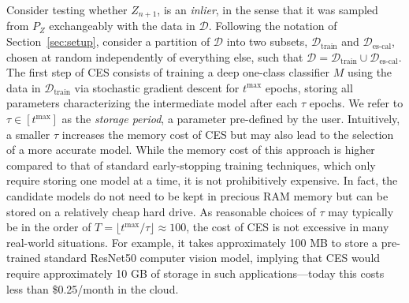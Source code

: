 Consider testing whether $Z_{n+1}$, is an {\em inlier}, in the sense that it was sampled from $P_Z$ exchangeably with the data in $\mathcal{D}$.
Following the notation of Section~\ref{sec:setup}, consider a partition of $\mathcal{D}$ into two subsets, $\mathcal{D}_{\text{train}}$ and $\mathcal{D}_{\text{es-cal}}$, chosen at random independently of everything else, such that $\mathcal{D}=\mathcal{D}_{\text{train}} \cup \mathcal{D}_{\text{es-cal}}$.
The first step of CES consists of training a deep one-class classifier $M$ using the data in $\mathcal{D}_{\text{train}}$ via stochastic gradient descent for $t^{\text{max}}$ epochs, storing all parameters characterizing the intermediate model after each $\tau$ epochs. We refer to $\tau \in [t^{\text{max}}]$ as the {\em storage period}, a parameter pre-defined by the user.
Intuitively, a smaller $\tau$ increases the memory cost of CES but may also lead to the selection of a more accurate model.
While the memory cost of this approach is higher compared to that of standard early-stopping training techniques, which only require storing one model at a time, it is not prohibitively expensive.
In fact, the candidate models do not need to be kept in precious RAM memory but can be stored on a relatively cheap hard drive.
As reasonable choices of $\tau$ may typically be in the order of $T = \lfloor t^{\text{max}} / \tau \rfloor \approx 100$, the cost of CES is not excessive in many real-world situations.
For example, it takes approximately 100 MB to store a pre-trained standard ResNet50 computer vision model, implying that CES would require approximately 10 GB of storage in such applications---today this costs less than \$0.25/month in the cloud.


